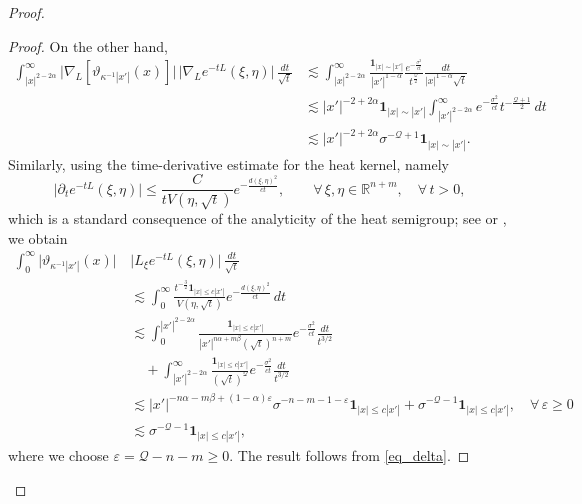 \documentclass[12pt]{amsart}
\begin{document}
\begin{proof}
\begin{proof}
On the other hand,
\begin{align*}
    \int_{|x|^{2-2\alpha}}^\infty \bigl|\nabla_L [\vartheta_{\kappa^{-1} |x'|}(x)]\bigr| \, \bigl|\nabla_L e^{-tL}(\xi,\eta)\bigr| \, \frac{dt}{\sqrt{t}}
    &\lesssim \int_{|x|^{2-2\alpha}}^\infty \frac{\mathbf{1}_{|x|\sim |x'|}}{|x'|^{1-\alpha}} \frac{e^{-\frac{\sigma^2}{c t}}}{t^{\frac{\mathcal{Q}}{2}}} \frac{dt}{|x|^{1-\alpha}\sqrt{t}}\\
    &\lesssim |x'|^{-2+2\alpha} \mathbf{1}_{|x|\sim |x'|} \int_{|x'|^{2-2\alpha}}^\infty e^{-\frac{\sigma^2}{c t}} t^{-\frac{\mathcal{Q}+1}{2}} \, dt\\
    &\lesssim |x'|^{-2+2\alpha} \sigma^{-\mathcal{Q}+1} \mathbf{1}_{|x|\sim|x'|}.
\end{align*}
Similarly, using the time-derivative estimate for the heat kernel, namely
\begin{equation*}
    \bigl|\partial_t e^{-tL}(\xi,\eta) \bigr| \le \frac{C}{t V(\eta,\sqrt{t})} e^{-\frac{d(\xi,\eta)^2}{c t}}, \qquad \forall\, \xi,\eta\in \mathbb{R}^{n+m},\quad \forall\, t>0,
\end{equation*}
which is a standard consequence of the analyticity of the heat semigroup; see \cite{D1989} or \cite{G1}, we obtain
\begin{align*}
    \int_0^\infty \bigl|\vartheta_{\kappa^{-1} |x'|}(x)\bigr| \, &\bigl|L_{\xi} e^{-tL}(\xi,\eta) \bigr| \, \frac{dt}{\sqrt{t}} \\
    &\lesssim  \int_0^\infty \frac{t^{-\frac{3}{2}} \mathbf{1}_{|x|\le c|x'|}}{V(\eta,\sqrt{t})} e^{-\frac{d(\xi,\eta)^2}{c t}} \, dt\\
    &\lesssim \int_0^{|x'|^{2-2\alpha}} \frac{ \mathbf{1}_{|x|\le c|x'|}}{|x'|^{n\alpha+m\beta}(\sqrt{t})^{n+m}} e^{-\frac{\sigma^2}{c t}} \frac{dt}{t^{3/2}}\\
    &\quad + \int_{|x'|^{2-2\alpha}}^\infty \frac{ \mathbf{1}_{|x|\le c|x'|}}{(\sqrt{t})^{\mathcal{Q}}} e^{-\frac{\sigma^2}{c t}} \frac{dt}{t^{3/2}}\\
    &\lesssim |x'|^{-n\alpha-m\beta+(1-\alpha)\varepsilon} \sigma^{-n-m-1-\varepsilon} \mathbf{1}_{|x|\le c|x'|} + \sigma^{-\mathcal{Q}-1} \mathbf{1}_{|x|\le c|x'|},\quad \forall\, \varepsilon\ge 0\\
    &\lesssim \sigma^{-\mathcal{Q}-1} \mathbf{1}_{|x|\le c|x'|},
\end{align*}
where we choose $\varepsilon = \mathcal{Q}-n-m \ge 0$. The result follows from \eqref{eq_delta}.
\end{proof}


\end{proof}
\end{document}
